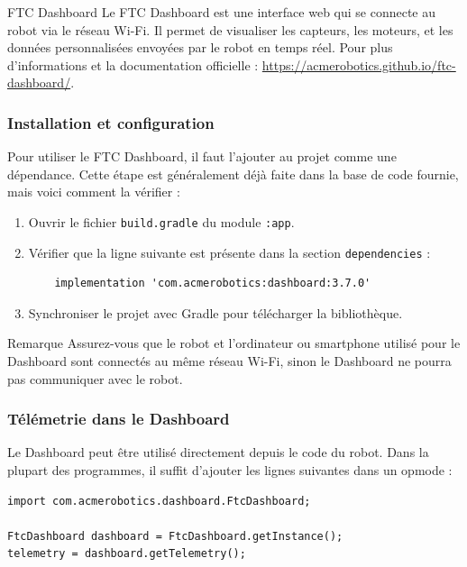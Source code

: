 \documentclass[12pt, a4paper]{report}
\begin{document}
    \begin{mydefinition}{FTC Dashboard}
        Le FTC Dashboard est une interface web qui se connecte au robot via le réseau Wi-Fi. Il permet de visualiser les capteurs, les moteurs, et les données personnalisées envoyées par le robot en temps réel.
        Pour plus d'informations et la documentation officielle : \url{https://acmerobotics.github.io/ftc-dashboard/}.
    \end{mydefinition}

    \subsubsection{Installation et configuration}

    Pour utiliser le FTC Dashboard, il faut l'ajouter au projet comme une dépendance. Cette étape est généralement déjà faite dans la base de code fournie, mais voici comment la vérifier :

    \begin{enumerate}
        \item Ouvrir le fichier \verb|build.gradle| du module \verb|:app|.
        \item Vérifier que la ligne suivante est présente dans la section \verb|dependencies| :
        \begin{verbatim}
    implementation 'com.acmerobotics:dashboard:3.7.0'
        \end{verbatim}
        \item Synchroniser le projet avec Gradle pour télécharger la bibliothèque.
    \end{enumerate}

    \begin{myinfo}{Remarque}
        Assurez-vous que le robot et l’ordinateur ou smartphone utilisé pour le Dashboard sont connectés au même réseau Wi-Fi, sinon le Dashboard ne pourra pas communiquer avec le robot.
    \end{myinfo}


    \subsubsection{Télémetrie dans le Dashboard}

    Le Dashboard peut être utilisé directement depuis le code du robot. Dans la plupart des programmes, il suffit d’ajouter les lignes suivantes dans un opmode :

    \begin{verbatim}
import com.acmerobotics.dashboard.FtcDashboard;

FtcDashboard dashboard = FtcDashboard.getInstance();
telemetry = dashboard.getTelemetry();
    \end{verbatim}
\end{document}
